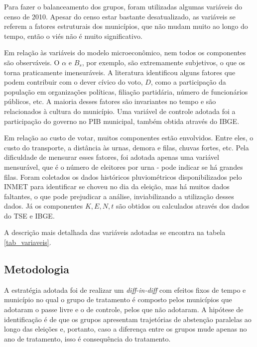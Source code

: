 Para fazer o balanceamento dos grupos, foram utilizadas algumas variáveis do censo de 2010. Apesar do censo estar bastante desatualizado, as variáveis se referem a fatores estruturais dos municípios, que não mudam muito ao longo do tempo, então o viés não é muito significativo.

Em relação às variáveis do modelo microeconômico, nem todos os componentes são observáveis. O $\alpha$ e $B_s$, por exemplo, são extremamente subjetivos, o que os torna praticamente imensuráveis. A literatura identificou alguns fatores que podem contribuir com o dever cívico do voto, $D$, como a participação da população em organizações políticas, filiação partidária, número de funcionários públicos, etc. A maioria desses fatores são invariantes no tempo e são relacionados à cultura do município. Uma variável de controle adotada foi a participação do governo no PIB municipal, também obtida através do IBGE. 

Em relação ao custo de votar, muitos componentes estão envolvidos. Entre eles, o custo do transporte, a distância às urnas, demora e filas, chuvas fortes, etc. Pela dificuldade de mensurar esses fatores, foi adotada apenas uma variável mensurável, que é o número de eleitores por urna - pode indicar se há grandes filas. Foram coletados os dados históricos pluviométricos disponibilizados pelo INMET para identificar se choveu no dia da eleição, mas há muitos dados faltantes, o que pode prejudicar a análise, inviabilizando a utilização desses dados. Já os componentes $K, E, N, t$ são obtidos ou calculados através dos dados do TSE e IBGE.

A descrição mais detalhada das variáveis adotadas se encontra na tabela \ref{tab_variaveis}.



\subsection{Metodologia}

A estratégia adotada foi de realizar um \textit{diff-in-diff} com efeitos fixos de tempo e município no qual o grupo de tratamento é composto pelos municípios que adotaram o passe livre e o de controle, pelos que não adotaram. A hipótese de identificação é de que os grupos apresentam trajetórias de abstenção paralelas ao longo das eleições e, portanto, caso a diferença entre os grupos mude apenas no ano de tratamento, isso é consequência do tratamento.

